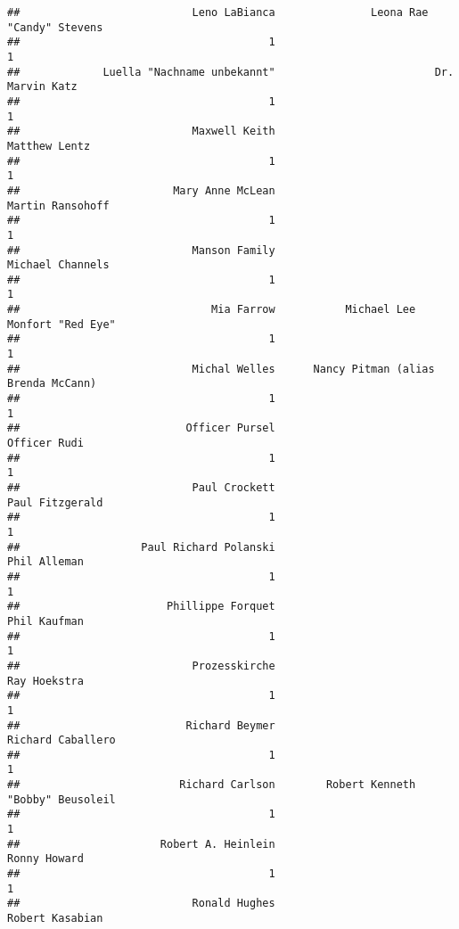 \documentclass[
]{article}
\begin{document}
\begin{verbatim}
##                           Leno LaBianca               Leona Rae "Candy" Stevens 
##                                       1                                       1 
##             Luella "Nachname unbekannt"                         Dr. Marvin Katz 
##                                       1                                       1 
##                           Maxwell Keith                           Matthew Lentz 
##                                       1                                       1 
##                        Mary Anne McLean                        Martin Ransohoff 
##                                       1                                       1 
##                           Manson Family                        Michael Channels 
##                                       1                                       1 
##                              Mia Farrow           Michael Lee Monfort "Red Eye" 
##                                       1                                       1 
##                           Michal Welles      Nancy Pitman (alias Brenda McCann) 
##                                       1                                       1 
##                          Officer Pursel                            Officer Rudi 
##                                       1                                       1 
##                           Paul Crockett                         Paul Fitzgerald 
##                                       1                                       1 
##                   Paul Richard Polanski                            Phil Alleman 
##                                       1                                       1 
##                       Phillippe Forquet                            Phil Kaufman 
##                                       1                                       1 
##                           Prozesskirche                            Ray Hoekstra 
##                                       1                                       1 
##                          Richard Beymer                       Richard Caballero 
##                                       1                                       1 
##                         Richard Carlson        Robert Kenneth "Bobby" Beusoleil 
##                                       1                                       1 
##                      Robert A. Heinlein                            Ronny Howard 
##                                       1                                       1 
##                           Ronald Hughes                         Robert Kasabian 

\end{verbatim}
\end{document}
